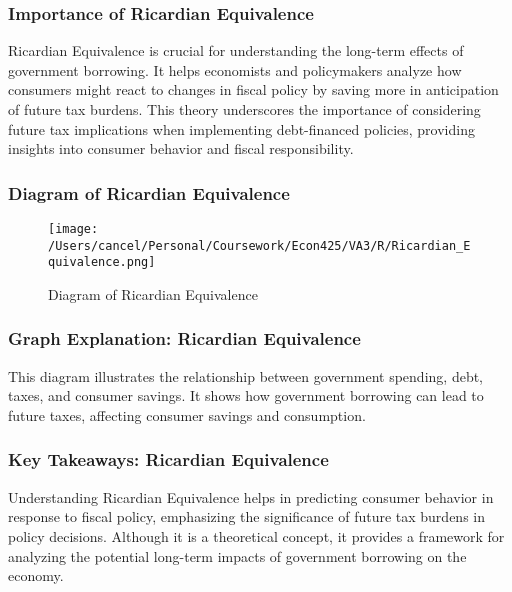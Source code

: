 \documentclass{beamer}
\begin{document}
\begin{frame}
    \frametitle{Importance of Ricardian Equivalence}
    Ricardian Equivalence is crucial for understanding the long-term effects of government borrowing. It helps economists and policymakers analyze how consumers might react to changes in fiscal policy by saving more in anticipation of future tax burdens. This theory underscores the importance of considering future tax implications when implementing debt-financed policies, providing insights into consumer behavior and fiscal responsibility.
\end{frame}

\begin{frame}
    \frametitle{Diagram of Ricardian Equivalence}
    \begin{figure}[h!]
        \centering
        \texttt{[image: /Users/cancel/Personal/Coursework/Econ425/VA3/R/Ricardian\_Equivalence.png]}
        \caption{Diagram of Ricardian Equivalence}
    \end{figure}
\end{frame}

\begin{frame}
    \frametitle{Graph Explanation: Ricardian Equivalence}
    This diagram illustrates the relationship between government spending, debt, taxes, and consumer savings. It shows how government borrowing can lead to future taxes, affecting consumer savings and consumption.
\end{frame}

\begin{frame}
    \frametitle{Key Takeaways: Ricardian Equivalence}
    Understanding Ricardian Equivalence helps in predicting consumer behavior in response to fiscal policy, emphasizing the significance of future tax burdens in policy decisions. Although it is a theoretical concept, it provides a framework for analyzing the potential long-term impacts of government borrowing on the economy.
\end{frame}
\end{document}
